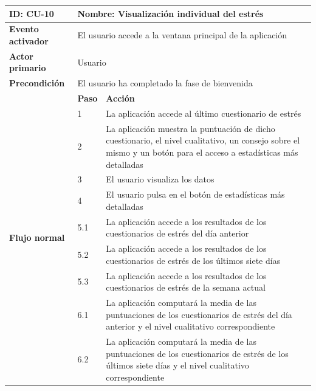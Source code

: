             \begin{table}[h]
                \centering
                \begin{tabularx}{\textwidth}{|l|l|X|}
                    \hline
                    \textbf{ID:} CU-10 & \multicolumn{2}{|X|}{\textbf{Nombre}: Visualización individual del estrés} \\
                    \hline
                    \textbf{Evento activador} & \multicolumn{2}{|X|}{El usuario accede a la ventana principal de la aplicación} \\
                    \hline
                    \textbf{Actor primario} & \multicolumn{2}{|X|}{Usuario} \\
                    \hline
                    \textbf{Precondición} & \multicolumn{2}{|X|}{El usuario ha completado la fase de bienvenida} \\
                    \hline
                    \multirow{13}{*}{\textbf{Flujo normal}} & \textbf{Paso} & \textbf{Acción} \\
                    \cline{2-3} & 1 & La aplicación accede al último cuestionario de estrés \\
                    \cline{2-3} & 2 & La aplicación muestra la puntuación de dicho cuestionario, el nivel cualitativo, un consejo sobre el mismo y un botón para el acceso a estadísticas más detalladas \\
                    \cline{2-3} & 3 & El usuario visualiza los datos \\
                    \cline{2-3} & 4 & El usuario pulsa en el botón de estadísticas más detalladas \\
                    \cline{2-3} & 5.1 & La aplicación accede a los resultados de los cuestionarios de estrés del día anterior \\
                    \cline{2-3} & 5.2 & La aplicación accede a los resultados de los cuestionarios de estrés de los últimos siete días \\
                    \cline{2-3} & 5.3 & La aplicación accede a los resultados de los cuestionarios de estrés de la semana actual \\
                    \cline{2-3} & 6.1 & La aplicación computará la media de las puntuaciones de los cuestionarios de estrés del día anterior y el nivel cualitativo correspondiente \\
                    \cline{2-3} & 6.2 & La aplicación computará la media de las puntuaciones de los cuestionarios de estrés de los últimos siete días y el nivel cualitativo correspondiente \\

\end{tabularx}
\end{table}
